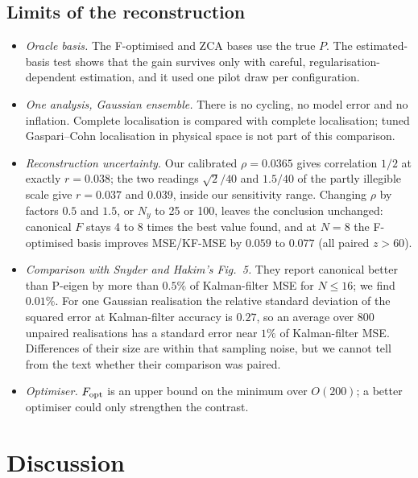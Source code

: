 \documentclass[11pt,a4paper]{article}
\numberwithin{equation}{section}
\theoremstyle{remark}\newtheorem{remark}[theorem]{Remark}
\begin{document}
\subsection{Limits of the reconstruction}\label{sec:sh-limits}

\begin{itemize}
\item \emph{Oracle basis.} The F-optimised and ZCA bases use the true \(P\). The estimated-basis
 test shows that the gain survives only with careful, regularisation-dependent estimation, and
 it used one pilot draw per configuration.
\item \emph{One analysis, Gaussian ensemble.} There is no cycling, no model error and no
 inflation. Complete localisation is compared with complete localisation; tuned
 Gaspari--Cohn localisation in physical space is not part of this comparison.
\item \emph{Reconstruction uncertainty.} Our calibrated \(\rho=0.0365\) gives correlation \(1/2\) at
 exactly \(r=0.038\); the two readings \(\sqrt2/40\) and \(1.5/40\) of the partly illegible scale give
 \(r=0.037\) and \(0.039\), inside our sensitivity range. Changing \(\rho\) by factors \(0.5\) and
 \(1.5\), or \(N_y\) to 25 or 100, leaves the conclusion unchanged: canonical \(F\) stays 4 to 8
 times the best value found, and at \(N=8\) the F-optimised basis improves MSE/KF-MSE by \(0.059\) to
 \(0.077\) (all paired \(z>60\)).
\item \emph{Comparison with Snyder and Hakim's Fig.~5.} They report canonical better than
 P-eigen by more than \(0.5\%\) of Kalman-filter MSE for \(N\le16\); we find \(0.01\%\). For one
 Gaussian realisation the relative standard deviation of the squared error at Kalman-filter
 accuracy is \(0.27\), so an average over 800 unpaired realisations has a standard error near
 \(1\%\) of Kalman-filter MSE. Differences of their size are within that sampling noise, but we
 cannot tell from the text whether their comparison was paired.
\item \emph{Optimiser.} \(F_{\rm opt}\) is an upper bound on the minimum over \(O(200)\); a better
 optimiser could only strengthen the contrast.
\end{itemize}

\section{Discussion}\label{sec:discussion}
\end{document}
